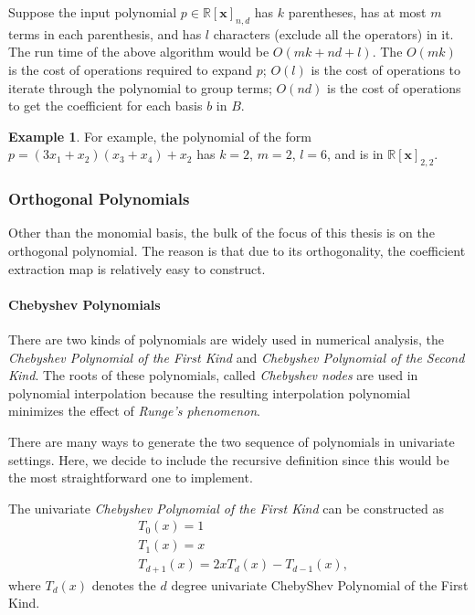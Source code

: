 \documentclass[12pt]{amsart}
\numberwithin{equation}{section}
\theoremstyle{definition}
\newtheorem{example}[thm]{Example}
\numberwithin{thm}{section}
\begin{document}
Suppose the input polynomial $p \in \mathbb{R}[\mathbf{x}]_{n, d}$ has $k$ parentheses, has at most $m$ terms in each parenthesis,
and has $l$ characters (exclude all the operators) in it. 
The run time of the above algorithm would be $O(mk + nd + l)$.
The $O(mk)$ is the cost of operations required to expand $p$;
$O(l)$ is the cost of operations to iterate through the polynomial to group terms;
$O(nd)$ is the cost of operations to get the coefficient for each basis $b$ in $B$.

\begin{example}
     For example, the polynomial of the form $p = (3x_1 + x_2) (x_3 + x_4) + x_2$ has $k = 2$, $m = 2$, $l = 6$, and is in $\mathbb{R}[\mathbf{x}]_{2, 2}$.
\end{example}

\subsubsection{Orthogonal Polynomials}
Other than the monomial basis, the bulk of the focus of this thesis is on the orthogonal polynomial.
The reason is that due to its orthogonality, the coefficient extraction map is relatively easy to construct. 

\smallskip

\paragraph{Chebyshev Polynomials}


There are two kinds of polynomials are widely used in numerical analysis,
the \emph{Chebyshev Polynomial of the First Kind} and \emph{Chebyshev Polynomial of the Second Kind}.
The roots of these polynomials, called \emph{Chebyshev nodes} 
are used in polynomial interpolation because 
the resulting interpolation polynomial minimizes the effect of \emph{Runge's phenomenon}.\cite{Mathews2004Numerical}

There are many ways to generate the two sequence of polynomials in univariate settings. 
Here, we decide to include the recursive definition since this would be the most straightforward one to implement.

The univariate \emph{Chebyshev Polynomial of the First Kind} can be constructed as
\begin{align*} 
     &T_0(x) = 1 \\ 
     &T_1(x) = x \\
     &T_{d+1}(x) = 2x T_d(x) - T_{d-1}(x),
\end{align*}
where $T_d(x)$ denotes the $d$ degree univariate ChebyShev Polynomial of the First Kind.
\end{document}
